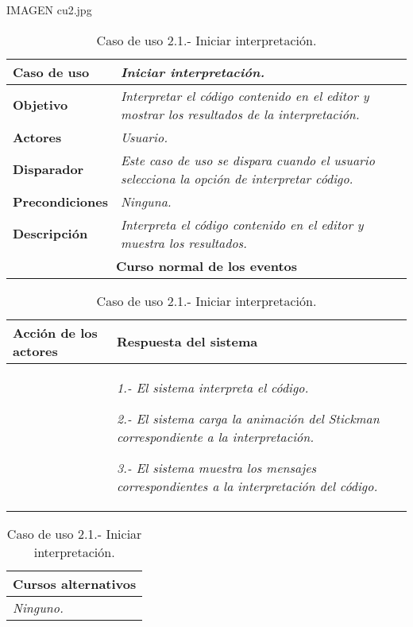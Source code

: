 \documentclass[twoside,a4paper,11pt]{book}
\begin{document}
IMAGEN cu2.jpg


\begin{table}[!ht]
    \centering
    \begin{tabular}{|p{4cm}|p{11.5cm}|}
    \hline

    \textbf{Caso de uso} & \textit{Iniciar interpretación.}\\
    \hline

    \textbf{Objetivo} & \textit{Interpretar el código contenido en el editor y mostrar los resultados de la interpretación.}\\
    \hline

    \textbf{Actores} & \textit{Usuario.}\\
    \hline

    \textbf{Disparador} & \textit{Este caso de uso se dispara cuando el usuario selecciona la opción de interpretar código.}\\
    \hline

    \textbf{Precondiciones} & \textit{Ninguna.}\\
    \hline

    \textbf{Descripción} & \textit{Interpreta el código contenido en el editor y muestra los resultados.}\\
    \hline

    \multicolumn{2}{|c|}{\textbf{Curso normal de los eventos}}\\
    \hline

    \end{tabular}
    \begin{tabular}{|p{7.75cm}|p{7.75cm}|}
    \hspace{2cm}\textbf{Acción de los actores} & \hspace{1.75cm}\textbf{Respuesta del sistema}\\
    \hline

    &
    \textit{1.- El sistema interpreta el código.}

    \textit{2.- El sistema carga la animación del Stickman correspondiente a la interpretación.}

    \textit{3.- El sistema muestra los mensajes correspondientes a la interpretación del código.}
    \\
    \hline
    \end{tabular}

    \begin{tabular}{|p{15.9cm}|}
      \hspace{6cm}\textbf{Cursos alternativos}\\
      \hline     
	\textit{Ninguno.}
      \\
      \hline
    \end{tabular}
    \caption{Caso de uso 2.1.- Iniciar interpretación.}
\end{table}
\end{document}
